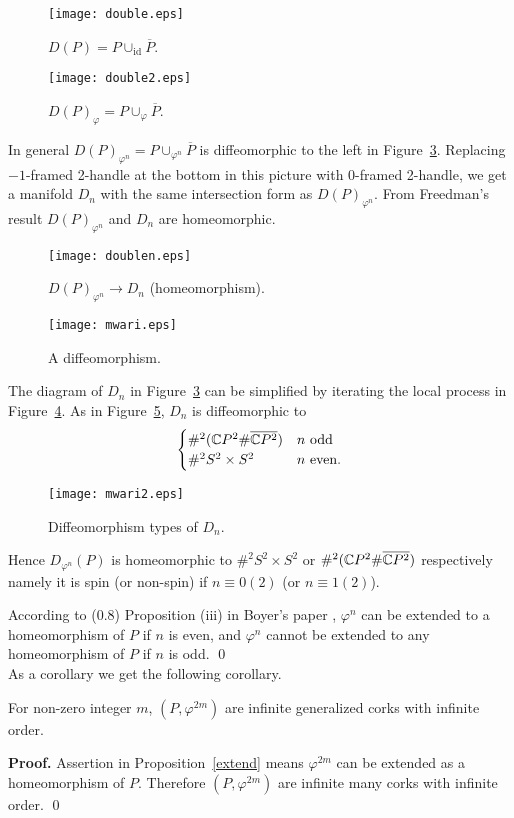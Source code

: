 \documentclass[11pt]{amsart}
\begin{document}
\begin{figure}[htbp]
\begin{center}
\texttt{[image: double.eps]}
\caption{$D(P)=P\cup_{\text{id}}\overline{P}$.}
\label{double}
\end{center}
\end{figure}
\begin{figure}[htbp]
\begin{center}
\texttt{[image: double2.eps]}
\caption{$D(P)_{\varphi}=P\cup_{\varphi}\overline{P}$.}
\label{double2}
\end{center}
\end{figure}

In general $D(P)_{\varphi^n}=P\cup_{\varphi^n}\overline{P}$ is diffeomorphic to the left in Figure~\ref{doublen}.
Replacing $-1$-framed 2-handle at the bottom in this picture with $0$-framed 2-handle,
we get a manifold $D_n$ with the same intersection form as $D(P)_{\varphi^n}$.
From Freedman's result $D(P)_{\varphi^n}$ and $D_n$ are homeomorphic.
\begin{figure}[htbp]
\begin{center}
\texttt{[image: doublen.eps]}
\caption{$D(P)_{\varphi^n}\to D_n$ (homeomorphism).}
\label{doublen}
\end{center}
\end{figure}
\begin{figure}[htbp]
\begin{center}
\texttt{[image: mwari.eps]}
\caption{A diffeomorphism.}
\label{mwari}
\end{center}
\end{figure}
The diagram of $D_n$ in Figure~\ref{doublen} can be simplified by iterating the local process in Figure~\ref{mwari}.
As in Figure~\ref{mwari2}, $D_n$ is diffeomorphic to 
$$\begin{cases}
\#^2({\Bbb C}P^2\#\overline{{\Bbb C}P^2})&n\text{ odd}\\
\#^2S^2\times S^2&n\text{ even.}
\end{cases}$$
\begin{figure}[htbp]
\begin{center}
\texttt{[image: mwari2.eps]}
\caption{Diffeomorphism types of $D_n$.}
\label{mwari2}
\end{center}
\end{figure}
Hence $D_{\varphi^n}(P)$ is homeomorphic to $\#^2S^2\times S^2$ or 
$\#^2({\Bbb C}P^2\#\overline{{\Bbb C}P^2})$ respectively 
namely it is spin (or non-spin) if $n\equiv 0(2)$ (or $n\equiv 1(2)$).

According to (0.8) Proposition (iii) in Boyer's paper \cite{[B]},
$\varphi^n$ can be extended to a homeomorphism of $P$ if $n$ is even,
and $\varphi^n$ cannot be extended to any homeomorphism of $P$ if $n$ is odd.
\qed
\medskip\\
As a corollary we get the following corollary.
\begin{cor}
\label{cork1}
For non-zero integer $m$,
$(P,\varphi^{2m})$ are infinite generalized corks with infinite order.
\end{cor}
{{\bf Proof. }}
Assertion in Proposition~\ref{extend} means $\varphi^{2m}$
can be extended as a homeomorphism of $P$.
Therefore $(P,\varphi^{2m})$ are infinite many corks with infinite order.
\qed
\medskip
\end{document}
